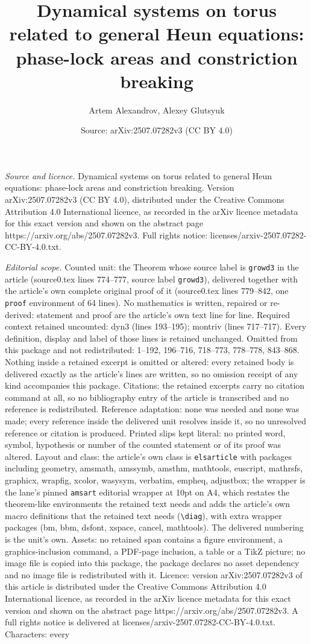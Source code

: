 \documentclass[10pt,a4paper]{amsart}
\title[Dynamical systems on torus related to general Heun equations]{Dynamical systems on torus related to general Heun equations: phase-lock areas and constriction breaking}
\author{Artem Alexandrov, Alexey Glutsyuk}
\date{Source: arXiv:2507.07282v3 (CC BY 4.0)}
\begin{document}
\maketitle

\noindent\emph{Source and licence.} Dynamical systems on torus related to general Heun equations: phase-lock areas and constriction breaking. Version arXiv:2507.07282v3 (CC BY 4.0), distributed under the Creative Commons Attribution 4.0 International licence, as recorded in the arXiv licence metadata for this exact version and shown on the abstract page https://arxiv.org/abs/2507.07282v3. Full rights notice: licenses/arxiv-2507.07282-CC-BY-4.0.txt.\par\smallskip

\noindent\textit{Editorial scope.} Counted unit: the Theorem whose source label is \texttt{growd3} in the article (source0.tex lines 774--777, source label \texttt{growd3}), delivered together with the article's own complete original proof of it (source0.tex lines 779--842, one \texttt{proof} environment of 64 lines). No mathematics is written, repaired or re-derived: statement and proof are the article's own text line for line. Required context retained uncounted: dyn3 (lines 193--195); montriv (lines 717--717). Every definition, display and label of those lines is retained unchanged. Omitted from this package and not redistributed: 1--192, 196--716, 718--773, 778--778, 843--868. Nothing inside a retained excerpt is omitted or altered: every retained body is delivered exactly as the article's lines are written, so no omission receipt of any kind accompanies this package. Citations: the retained excerpts carry no citation command at all, so no bibliography entry of the article is transcribed and no reference is redistributed. Reference adaptation: none was needed and none was made; every reference inside the delivered unit resolves inside it, so no unresolved reference or citation is produced. Printed slips kept literal: no printed word, symbol, hypothesis or number of the counted statement or of its proof was altered. Layout and class: the article's own class is \texttt{elsarticle} with packages including geometry, amsmath, amssymb, amsthm, mathtools, euscript, mathrsfs, graphicx, wrapfig, xcolor, wasysym, verbatim, empheq, adjustbox; the wrapper is the lane's pinned \texttt{amsart} editorial wrapper at 10pt on A4, which restates the theorem-like environments the retained text needs and adds the article's own macro definitions that the retained text needs (\texttt{\textbackslash diag}), with extra wrapper packages (bm, bbm, dsfont, xspace, cancel, mathtools). The delivered numbering is the unit's own. Assets: no retained span contains a figure environment, a graphics-inclusion command, a PDF-page inclusion, a table or a TikZ picture; no image file is copied into this package, the package declares no asset dependency and no image file is redistributed with it. Licence: version arXiv:2507.07282v3 of this article is distributed under the Creative Commons Attribution 4.0 International licence, as recorded in the arXiv licence metadata for this exact version and shown on the abstract page https://arxiv.org/abs/2507.07282v3. A full rights notice is delivered at licenses/arxiv-2507.07282-CC-BY-4.0.txt. Characters: every 
\end{document}
